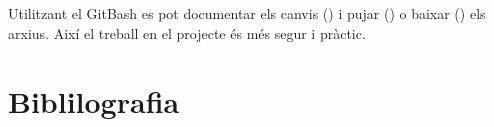 \documentclass[]{article}
\begin{document}
Utilitzant el GitBash es pot documentar els canvis () i pujar () o baixar () els arxius. Així el treball en el projecte és més segur i pràctic.

\section*{Biblilografia}

\begingroup
\renewcommand{\section}[2]{}%

\endgroup



\newpage
\section*{Apèndix}
\appendix 
\end{document}
